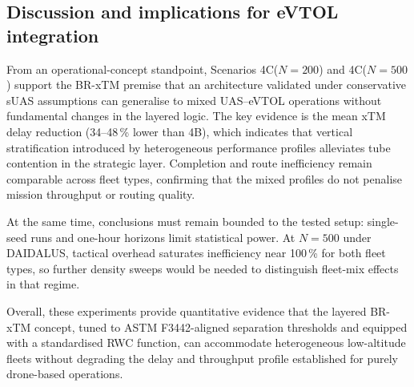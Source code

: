 \subsection{Discussion and implications for eVTOL integration}

From an operational-concept standpoint, Scenarios 4C($N=200$) and 4C($N=500$) support the BR-xTM
premise that an architecture validated under conservative sUAS assumptions can generalise to mixed
UAS--eVTOL operations without fundamental changes in the layered logic. The key evidence is the
mean xTM delay reduction (34--48\,\% lower than 4B), which indicates that vertical stratification
introduced by heterogeneous performance profiles alleviates tube contention in the strategic layer.
Completion and route inefficiency remain comparable across fleet types, confirming that the mixed
profiles do not penalise mission throughput or routing quality.

At the same time, conclusions must remain bounded to the tested setup: single-seed runs and
one-hour horizons limit statistical power. At $N=500$ under DAIDALUS, tactical overhead saturates
inefficiency near 100\,\% for both fleet types, so further density sweeps would be needed to
distinguish fleet-mix effects in that regime.

Overall, these experiments provide quantitative evidence that the layered BR-xTM concept, tuned to
ASTM F3442-aligned separation thresholds and equipped with a standardised RWC function, can
accommodate heterogeneous low-altitude fleets without degrading the delay and throughput profile
established for purely drone-based operations.

